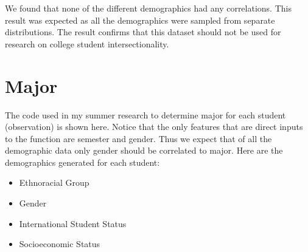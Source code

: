 \documentclass[
  twocolumn]{article}
\providecommand{\tightlist}{%
  \setlength{\itemsep}{0pt}\setlength{\parskip}{0pt}}
\begin{document}
We found that none of the different demographics had any correlations.
This result was expected as all the demographics were sampled from
separate distributions. The result confirms that this dataset should not
be used for research on college student intersectionality.

\section{Major}\label{major}

The code used in my summer research to determine major for each student
(observation) is shown here. Notice that the only features that are
direct inputs to the function are semester and gender. Thus we expect
that of all the demographic data only gender should be correlated to
major. Here are the demographics generated for each student:

\begin{itemize}
\tightlist
\item
  Ethnoracial Group
\item
  Gender
\item
  International Student Status
\item
  Socioeconomic Status
\end{itemize}
\end{document}
